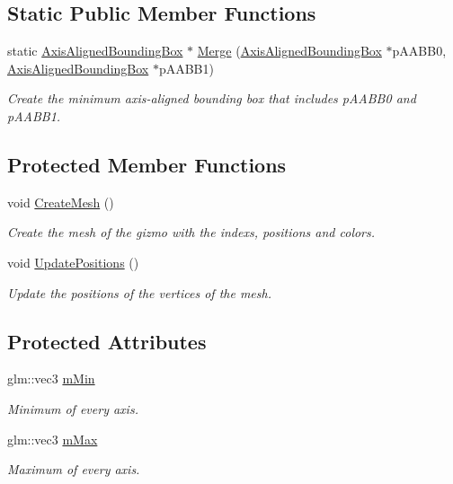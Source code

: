 \subsection*{Static Public Member Functions}
\begin{DoxyCompactItemize}
\item 
static \hyperlink{class_axis_aligned_bounding_box}{Axis\+Aligned\+Bounding\+Box} $\ast$ \hyperlink{class_axis_aligned_bounding_box_a61b32a895b9817aac82e767a561416aa}{Merge} (\hyperlink{class_axis_aligned_bounding_box}{Axis\+Aligned\+Bounding\+Box} $\ast$p\+A\+A\+B\+B0, \hyperlink{class_axis_aligned_bounding_box}{Axis\+Aligned\+Bounding\+Box} $\ast$p\+A\+A\+B\+B1)
\begin{DoxyCompactList}\small\item\em Create the minimum axis-\/aligned bounding box that includes p\+A\+A\+B\+B0 and p\+A\+A\+B\+B1. \end{DoxyCompactList}\end{DoxyCompactItemize}
\subsection*{Protected Member Functions}
\begin{DoxyCompactItemize}
\item 
void \hyperlink{class_axis_aligned_bounding_box_a4f6fdbced63eabf9e7f32632f20bb610}{Create\+Mesh} ()
\begin{DoxyCompactList}\small\item\em Create the mesh of the gizmo with the indexs, positions and colors. \end{DoxyCompactList}\item 
void \hyperlink{class_axis_aligned_bounding_box_a9682fe904e3c0c1369b4e94002c9b025}{Update\+Positions} ()
\begin{DoxyCompactList}\small\item\em Update the positions of the vertices of the mesh. \end{DoxyCompactList}\end{DoxyCompactItemize}
\subsection*{Protected Attributes}
\begin{DoxyCompactItemize}
\item 
glm\+::vec3 \hyperlink{class_axis_aligned_bounding_box_a25566485f0da4e52c51e6f56f8148991}{m\+Min}
\begin{DoxyCompactList}\small\item\em Minimum of every axis. \end{DoxyCompactList}\item 
glm\+::vec3 \hyperlink{class_axis_aligned_bounding_box_a8d9f15c8e2dbaaa7567e76013e948e1a}{m\+Max}
\begin{DoxyCompactList}\small\item\em Maximum of every axis. \end{DoxyCompactList}\end{DoxyCompactItemize}


